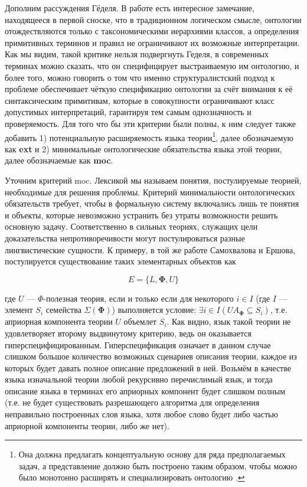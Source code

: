 \documentclass[14pt]{extarticle}
\begin{document}
	Дополним рассуждения Гёделя. В работе \cite{Gruber1993} есть интересное замечание, находящееся в первой сноске, что в традиционном логическом смысле, онтологии отождествляются только с таксономическими иерархиями классов, а определения примитивных терминов и правил не ограничивают их возможные интерпретации. Как мы видим, такой критике нельзя подвергнуть Геделя, в современных терминах можно сказать, что он специфицирует выстраиваемую им онтологию, и более того, можно говорить о том что именно структуралистский подход к проблеме обеспечивает чёткую спецификацию онтологии за счёт внимания к её синтаксическим примитивам, которые в совокупности ограничивают класс допустимых интерпретаций, гарантируя тем самым однозначность и проверяемость. Для того что бы эти критерии были полны, к ним следует также добавить 1) потенциальную расширяемость языка теории\footnote{Она должна предлагать концептуальную основу для ряда предполагаемых задач, а представление должно быть построено таким образом, чтобы можно было монотонно расширять и специализировать онтологию \cite[3]{Gruber1993}.}, далее обозначаемую как \textbf{ext} и 2) минимальные онтологические обязательства языка этой теории, далее обозначаемые как \textbf{moc}.
	
	Уточним критерий moc. Лексикой мы называем понятия, постулируемые теорией, необходимые для решения проблемы. Критерий минимальности онтологических обязательств требует, чтобы в формальную систему включались лишь те понятия и объекты, которые невоз­можно устранить без утраты возможности решить основную задачу. Соответственно в сильных теориях, служащих цели доказательства непротиворечивости могут постулироваться разные лингвистические сущности. К примеру, в той же работе Самохвалова и Ершова, постулируется \cite[38]{Samohvalov} существование таких элементарных объектов как 
	
	\[
	E = \{ L, \mathbf{\Phi}, U \}
	\]
	
	где \( U \) — \( \Phi \)-полезная теория, если и только если для некоторого \( i \in I \) (где \( I \) — элемент \( S_i \) семейства \({\Sigma}(\mathbf{\Phi}) \)) выполняется условие: \( \exists i \in I ( UA_{\mathbf{\Phi}} \subseteq S_i )\), т.е. априорная компонента теории \( U \) объемлет \( S_i \).
	Как видно, язык такой теории не удовлетворяет второму выдвинутому критерию, ведь он оказывается гиперспецифицированным. Гиперспецификация означает в данном случае слишком большое количество возможных сценариев описания теории, каждое из которых будет давать полное описание предложений в ней. Возьмём в качестве языка изначальной теории любой рекурсивно перечислимый язык, и тогда описание языка в терминах его априорных компонент будет слишком полным (т.е. не будет существовать разрешающего алгоритма для определения неправильно построенных слов языка, хотя любое слово будет либо частью априорной компоненты теории, либо же нет).
\end{document}
